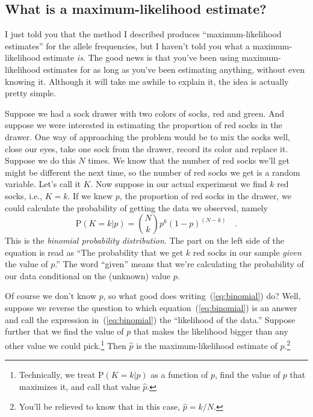 \documentclass[12pt]{article}
\begin{document}
\subsection*{What is a maximum-likelihood
  estimate?}

I just told you that the method I described produces
``maximum-likelihood estimates'' for the allele frequencies, but I
haven't told you what a maximum-likelihood estimate {\it is\/}. The
good news is that you've been using maximum-likelihood estimates for
as long as you've been estimating anything, without even knowing
it. Although it will take me awhile to explain it, the idea is
actually pretty simple.

Suppose we had a sock drawer with two colors of socks, red and
green. And suppose we were interested in estimating the proportion of
red socks in the drawer. One way of approaching the problem would be
to mix the socks well, close our eyes, take one sock from the drawer,
record its color and replace it. Suppose we do this $N$ times. We know
that the number of red socks we'll get might be different the next
time, so the number of red socks we get is a random variable. Let's
call it $K$. Now suppose in our actual experiment we find $k$ red
socks, i.e., $K=k$. If we knew $p$, the proportion of red socks in the
drawer, we could calculate the probability of getting the data we
observed, namely
\begin{equation}
\mbox{P}(K=k|p) = {N \choose k} p^k (1-p)^{(N-k)} \quad . \label{eq:binomial}
\end{equation}
This is the {\it binomial probability distribution}. The part on the
left side of the equation is read as ``The probability that we get $k$
red socks in our sample {\it given\/} the value of $p$.'' The word
``given'' means that we're calculating the probability of our data
conditional on the (unknown) value $p$.

Of course we don't know $p$, so what good does
writing~(\ref{eq:binomial}) do? Well, suppose we reverse the question
to which equation~(\ref{eq:binomial}) is an answer and call the
expression in~(\ref{eq:binomial}) the ``likelihood of the data.''
Suppose further that we find the value of $p$ that makes the
likelihood bigger than any other value we could
pick.\footnote{Technically, we treat $\mbox{P}(K=k|p)$ as a function
  of $p$, find the value of $p$ that maximizes it, and call that value
  $\hat p$.} Then $\hat p$ is the maximum-likelihood estimate of
$p$.\footnote{You'll be relieved to know that in this case, $\hat p =
  k/N$.}
\end{document}
